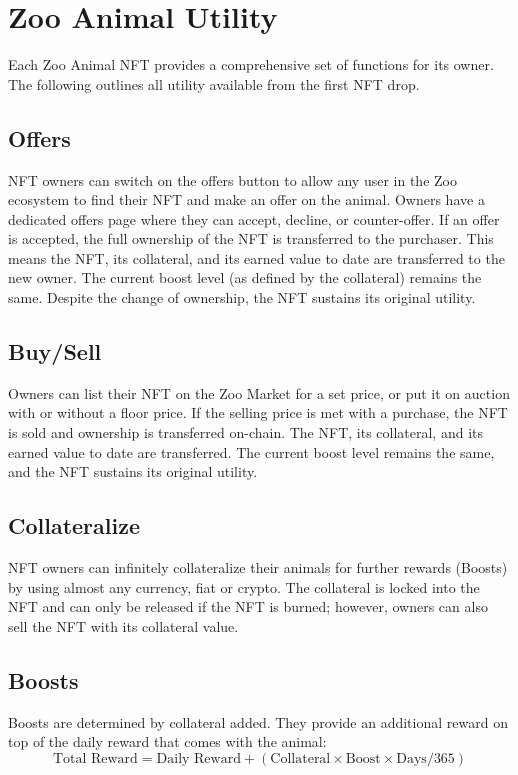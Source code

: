 \section{Zoo Animal Utility}
\label{sec:animal-utility}

Each Zoo Animal NFT provides a comprehensive set of functions for its owner. The following outlines all utility available from the first NFT drop.

\subsection{Offers}
NFT owners can switch on the offers button to allow any user in the Zoo ecosystem to find their NFT and make an offer on the animal. Owners have a dedicated offers page where they can accept, decline, or counter-offer. If an offer is accepted, the full ownership of the NFT is transferred to the purchaser. This means the NFT, its collateral, and its earned value to date are transferred to the new owner. The current boost level (as defined by the collateral) remains the same. Despite the change of ownership, the NFT sustains its original utility.

\subsection{Buy/Sell}
Owners can list their NFT on the Zoo Market for a set price, or put it on auction with or without a floor price. If the selling price is met with a purchase, the NFT is sold and ownership is transferred on-chain. The NFT, its collateral, and its earned value to date are transferred. The current boost level remains the same, and the NFT sustains its original utility.

\subsection{Collateralize}
NFT owners can infinitely collateralize their animals for further rewards (Boosts) by using almost any currency, fiat or crypto. The collateral is locked into the NFT and can only be released if the NFT is burned; however, owners can also sell the NFT with its collateral value.

\subsection{Boosts}
Boosts are determined by collateral added. They provide an additional reward on top of the daily reward that comes with the animal:
\begin{equation}
\text{Total Reward} = \text{Daily Reward} + (\text{Collateral} \times \text{Boost} \times \text{Days}/365)
\end{equation}


